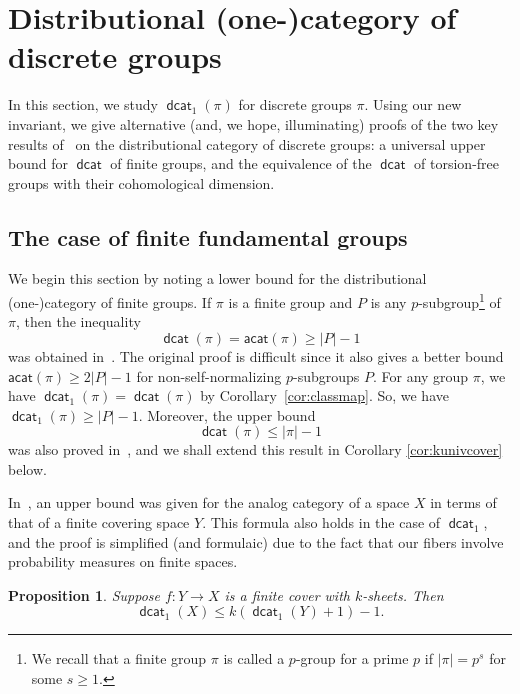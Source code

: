 \documentclass[amscd,amssymb,verbatim,11pt]{amsart}
\theoremstyle{plain}
\newtheorem{proposition}[thm]{Proposition}
\theoremstyle{definition}
\DeclareMathOperator{\dcat}{{\mathsf{dcat}}}
\begin{document}
\section{Distributional (one-)category of discrete groups}\label{dcat1 of groups}

In this section, we study $\dcat_1(\pi)$ for discrete groups $\pi$. Using our new invariant, we give alternative (and, we hope, illuminating) proofs of the two key results of~\cite{KW} on the distributional category of discrete groups: a universal upper bound for $\dcat$ of finite groups, and the equivalence of the $\dcat$ of torsion-free groups with their cohomological dimension.

\subsection{The case of finite fundamental groups}\label{sec:finitefund}
We begin this section by noting a lower bound for the distributional (one-)category of finite groups. If $\pi$ is a finite group and $P$ is any $p$-subgroup\hspace{0.3mm}\footnote{\hspace{0.3mm}We recall that a finite group $\pi$ is called a $p$-group for a prime $p$ if $|\pi|=p^s$ for some $s\ge 1$.} of $\pi$, then the inequality
\[
\dcat(\pi)=\mathsf{acat}(\pi)\ge |P|-1
\]
was obtained in~\cite[Proposition 4.3]{KW2}. The original proof is difficult since it also gives a better bound $\mathsf{acat}(\pi)\ge 2|P|-1$ for non-self-normalizing $p$-subgroups $P$. For any group $\pi$, we have $\dcat_1(\pi)=\dcat(\pi)$ by Corollary~\ref{cor:classmap}. So, we have $\dcat_1(\pi)\ge |P|-1$. 
Moreover, the upper bound 
$$\dcat(\pi) \leq |\pi| - 1$$
was also proved in~\cite{KW}, and we shall extend this result in Corollary 
\ref{cor:kunivcover} below.

In~\cite[Proposition 6.6]{KW}, an upper bound was given for the analog category of a space $X$ in terms of that of a finite
covering space $Y$. This formula also holds in the case of $\dcat_1$, and the proof is simplified (and
formulaic) due to the fact that our fibers involve probability measures on finite spaces. 

\begin{proposition}\label{prop:kcover}
Suppose $f\colon Y \to X$ is a finite cover with $k$-sheets. Then
$$\dcat_1(X) \leq k(\dcat_1(Y)+1) - 1.$$
\end{proposition}
\end{document}
